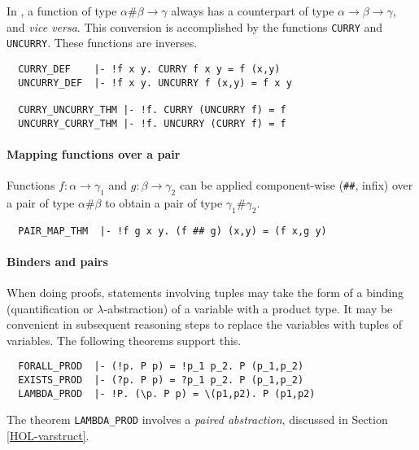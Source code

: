 In \HOL{}, a function of type $\alpha \# \beta\to\gamma$ always has a
counterpart of type $\alpha\to\beta\to\gamma$, and \emph{vice versa}.
This conversion is accomplished by the functions {\small\verb+CURRY+}
and {\small\verb+UNCURRY+}. These functions are inverses.
%
\begin{hol}
{\small
\begin{verbatim}
  CURRY_DEF    |- !f x y. CURRY f x y = f (x,y)
  UNCURRY_DEF  |- !f x y. UNCURRY f (x,y) = f x y

  CURRY_UNCURRY_THM |- !f. CURRY (UNCURRY f) = f
  UNCURRY_CURRY_THM |- !f. UNCURRY (CURRY f) = f
\end{verbatim}
}
\end{hol}


\paragraph {Mapping functions over a pair}

Functions $f : \alpha \to \gamma_1$ and $g : \beta\to\gamma_2$ can be
applied component-wise ({\small\verb+##+}, infix) over a pair of type
$\alpha \# \beta$ to obtain a pair of type $\gamma_1 \# \gamma_2$.
%
\begin{hol}
{\small
\begin{verbatim}
  PAIR_MAP_THM  |- !f g x y. (f ## g) (x,y) = (f x,g y)
\end{verbatim}
}
\end{hol}

\paragraph {Binders and pairs}

When doing proofs, statements involving tuples may take the form of a
binding (quantification or $\lambda$-abstraction) of a variable with a
product type. It may be convenient in subsequent reasoning steps to
replace the variables with tuples of variables. The following theorems
support this.
%
 \begin{hol}
{\small
\begin{verbatim}
  FORALL_PROD  |- (!p. P p) = !p_1 p_2. P (p_1,p_2)
  EXISTS_PROD  |- (?p. P p) = ?p_1 p_2. P (p_1,p_2)
  LAMBDA_PROD  |- !P. (\p. P p) = \(p1,p2). P (p1,p2)
\end{verbatim}
}
\end{hol}
%
The theorem {\small\verb+LAMBDA_PROD+} involves a \emph{paired
 abstraction}, discussed in Section \ref{HOL-varstruct}.



